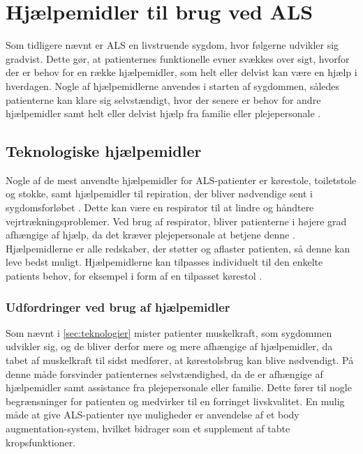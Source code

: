 \section{Hjælpemidler til brug ved ALS} \label{sec:teknologier}
Som tidligere nævnt er ALS en livstruende sygdom, hvor følgerne udvikler sig gradvist. Dette gør, at patienternes funktionelle evner svækkes over sigt, hvorfor der er behov for en række hjælpemidler, som helt eller delvist kan være en hjælp i hverdagen. Nogle af hjælpemidlerne anvendes i starten af sygdommen, således patienterne kan klare sig selvstændigt, hvor der senere er behov for andre hjælpemidler samt helt eller delvist hjælp fra familie eller plejepersonale \citep{brandt2010}.

\subsection{Teknologiske hjælpemidler}
Nogle af de mest anvendte hjælpemidler for ALS-patienter er kørestole, toiletstole og stokke, \citep{brandt2010} samt hjælpemidler til repiration, der bliver nødvendige sent i sygdomsforløbet \citep{hefferman2006}. Dette kan være en respirator til at lindre og håndtere vejrtrækningsproblemer. Ved brug af respirator, bliver patienterne i højere grad afhængige af hjælp, da det kræver plejepersonale at betjene denne  \citep{rcfm2001}.  Hjælpemidlerne er alle redskaber, der støtter og aflaster patienten, så denne kan leve bedst muligt. Hjælpemidlerne kan tilpasses individuelt til den enkelte patients behov, for eksempel i form af en tilpasset kørestol \citep{brandt2010}.

\subsubsection{Udfordringer ved brug af hjælpemidler}
Som nævnt i \autoref{sec:teknologier} mister patienter muskelkraft, som sygdommen udvikler sig, og de bliver derfor mere og mere afhængige af hjælpemidler, da tabet af muskelkraft til sidst medfører, at kørestolsbrug kan blive nødvendigt. På denne måde forsvinder patienternes selvstændighed, da de er afhængige af hjælpemidler samt assistance fra plejepersonale eller familie. \citep{brandt2010} Dette fører til nogle begrænsninger for patienten og medvirker til en forringet livskvalitet. En mulig måde at give ALS-patienter nye muligheder er anvendelse af et body augmentation-system, hvilket bidrager som et supplement af tabte kropsfunktioner. \citep{erlen2003} 

